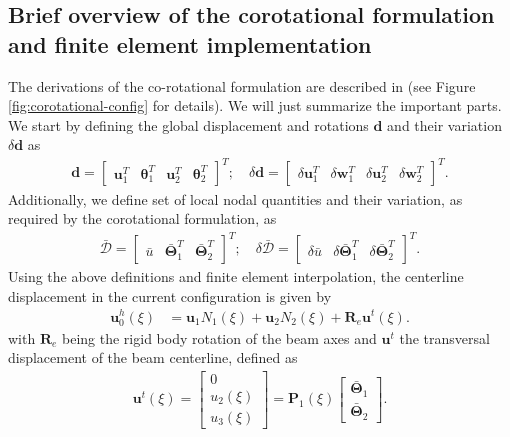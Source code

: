 \documentclass[3p]{elsarticle}
\newcommand{\vect}[1]{\boldsymbol{#1}}
\begin{document}
\subsection{Brief overview of the corotational formulation and finite element implementation}
The derivations of the co-rotational formulation are described in \cite{Aguirre2020} (see Figure \ref{fig:corotational-config} for details). We will just summarize the important parts. We start by defining the global displacement and rotations $\vect{d}$ and their variation $\delta\vect{d}$ as
\begin{align}
	\vect{d}=\left[\begin{array}{cccc}\vect{u}_1^T&\vect{\theta}_1^T&\vect{u}_2^T&\vect{\theta}_2^T
	\end{array}\right]^T;\quad\delta\vect{d}=\left[\begin{array}{cccc}\delta\vect{u}_1^T&\delta\vect{w}_1^T&\delta\vect{u}_2^T&\delta\vect{w}_2^T
	\end{array}\right]^T.\label{eq:d-deltad}
\end{align}
\noindent Additionally, we define set of local nodal quantities and their variation, as required by the corotational formulation, as
\begin{align}
	\bar{\vect{\mathcal{D}}}=\left[\begin{array}{ccc}\bar{u}&\bar{\vect{\Theta}}_1^T&\bar{\vect{\Theta}}_2^T
	\end{array}\right]^T;\quad \delta\bar{\vect{\mathcal{D}}}=\left[\begin{array}{ccc}\delta\bar{u}&\delta\bar{\vect{\Theta}}_1^T&\delta\bar{\vect{\Theta}}_2^T
	\end{array}\right]^T.\label{eq:dbar-deltadbar}
\end{align}
Using the above definitions and finite element interpolation, the centerline displacement in the current configuration is given by 
\begin{align}
	{\vect{u}}_0^h(\xi)&=\vect{u}_1 N_1(\xi)  + \vect{u}_2 N_2(\xi) +\vect{R}_e{\vect{u}}^t(\xi).\label{eq:uoh}
\end{align}
\noindent with $\vect{R}_e$ being the rigid body rotation of the beam axes and ${\vect{u}}^t$ the transversal displacement of the beam centerline, defined as
\begin{align}
\vect{u}^t(\xi)=\left[\begin{array}{c}
		0\\
		{u}_2(\xi) \\
		{u}_3(\xi) 
	\end{array}\right]=\vect{P}_1(\xi)\left[\begin{array}{c}
		\bar{\vect{\Theta}}_1\\
		\bar{\vect{\Theta}}_2
	\end{array}\right].
\end{align}
\end{document}
